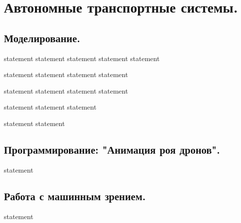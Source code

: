 \chapter{Автономные транспортные системы.}

\section{Моделирование.}

{statement}
{statement}
{statement}
{statement}
{statement}

{statement}
{statement}
{statement}
{statement}

{statement}
{statement}
{statement}
{statement}

{statement}
{statement}
{statement}

{statement}
{statement}

\section{Программирование: "Анимация роя дронов".}

{statement}

\section{Работа с машинным зрением.}

{statement}